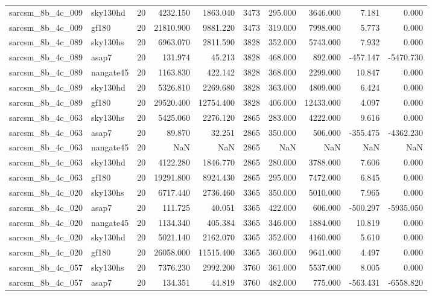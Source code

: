\documentclass{article}
\begin{document}
\begin{longtable}{llrrrrrrrr}
sarcsm\_8b\_4c\_009 & sky130hd & 20 & 4232.150 & 1863.040 & 3473 & 295.000 & 3646.000 & 7.181 & 0.000 \\
sarcsm\_8b\_4c\_009 & gf180 & 20 & 21810.900 & 9881.220 & 3473 & 319.000 & 7998.000 & 5.773 & 0.000 \\
sarcsm\_8b\_4c\_089 & sky130hs & 20 & 6963.070 & 2811.590 & 3828 & 352.000 & 5743.000 & 7.932 & 0.000 \\
sarcsm\_8b\_4c\_089 & asap7 & 20 & 131.974 & 45.213 & 3828 & 468.000 & 892.000 & -457.147 & -5470.730 \\
sarcsm\_8b\_4c\_089 & nangate45 & 20 & 1163.830 & 422.142 & 3828 & 368.000 & 2299.000 & 10.847 & 0.000 \\
sarcsm\_8b\_4c\_089 & sky130hd & 20 & 5326.810 & 2269.680 & 3828 & 363.000 & 4809.000 & 6.424 & 0.000 \\
sarcsm\_8b\_4c\_089 & gf180 & 20 & 29520.400 & 12754.400 & 3828 & 406.000 & 12433.000 & 4.097 & 0.000 \\
sarcsm\_8b\_4c\_063 & sky130hs & 20 & 5425.060 & 2276.120 & 2865 & 283.000 & 4222.000 & 9.616 & 0.000 \\
sarcsm\_8b\_4c\_063 & asap7 & 20 & 89.870 & 32.251 & 2865 & 350.000 & 506.000 & -355.475 & -4362.230 \\
sarcsm\_8b\_4c\_063 & nangate45 & 20 & NaN & NaN & 2865 & NaN & NaN & NaN & NaN \\
sarcsm\_8b\_4c\_063 & sky130hd & 20 & 4122.280 & 1846.770 & 2865 & 280.000 & 3788.000 & 7.606 & 0.000 \\
sarcsm\_8b\_4c\_063 & gf180 & 20 & 19291.800 & 8924.430 & 2865 & 295.000 & 7472.000 & 6.845 & 0.000 \\
sarcsm\_8b\_4c\_020 & sky130hs & 20 & 6717.440 & 2736.460 & 3365 & 350.000 & 5010.000 & 7.965 & 0.000 \\
sarcsm\_8b\_4c\_020 & asap7 & 20 & 111.725 & 40.051 & 3365 & 422.000 & 606.000 & -500.297 & -5935.050 \\
sarcsm\_8b\_4c\_020 & nangate45 & 20 & 1134.340 & 405.384 & 3365 & 346.000 & 1884.000 & 10.819 & 0.000 \\
sarcsm\_8b\_4c\_020 & sky130hd & 20 & 5021.140 & 2162.070 & 3365 & 352.000 & 4160.000 & 5.610 & 0.000 \\
sarcsm\_8b\_4c\_020 & gf180 & 20 & 26058.000 & 11515.400 & 3365 & 360.000 & 9641.000 & 4.497 & 0.000 \\
sarcsm\_8b\_4c\_057 & sky130hs & 20 & 7376.230 & 2992.200 & 3760 & 361.000 & 5537.000 & 8.005 & 0.000 \\
sarcsm\_8b\_4c\_057 & asap7 & 20 & 134.351 & 44.819 & 3760 & 482.000 & 775.000 & -563.431 & -6558.820 \\

\end{longtable}
\end{document}
